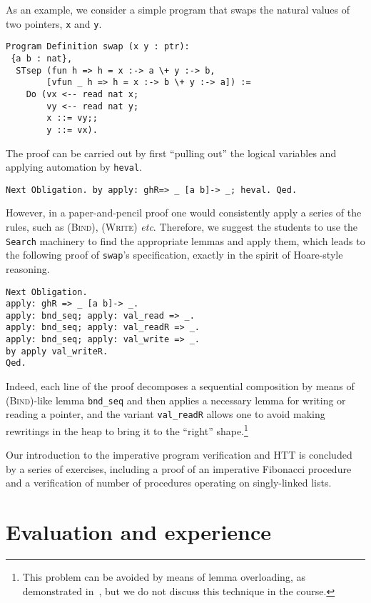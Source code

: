 \documentclass[blockstyle,preprint,nocopyrightspace]{sigplanconf}
\newcommand{\an}[1]{\textcolor{red}{(Aleks: {#1})}}
\newcommand{\code}[1]{\lstinline{#1}}
\newcommand{\etc}{\emph{etc}}
\begin{document}
As an example, we consider a simple program that swaps the natural
values of two pointers, \code{x} and \code{y}.
%
\begin{lstlisting}
Program Definition swap (x y : ptr):
 {a b : nat},
  STsep (fun h => h = x :-> a \+ y :-> b,
        [vfun _ h => h = x :-> b \+ y :-> a]) :=
    Do (vx <-- read nat x;
        vy <-- read nat y;
        x ::= vy;;
        y ::= vx).
\end{lstlisting}
%
The proof can be carried out by first ``pulling out'' the logical
variables and applying automation by \code{heval}.
%
\begin{lstlisting}
Next Obligation. by apply: ghR=> _ [a b]-> _; heval. Qed.
\end{lstlisting}
%
However, in a paper-and-pencil proof one would consistently apply a
series of the rules, such as \textsc{(Bind)}, \textsc{(Write)}
\etc. Therefore, we suggest the students to use the \code{Search}
machinery to find the appropriate lemmas and apply them, which leads
to the following proof of \code{swap}'s specification, exactly in the
spirit of Hoare-style reasoning.
%
\begin{lstlisting}
Next Obligation.
apply: ghR => _ [a b]-> _.
apply: bnd_seq; apply: val_read => _.
apply: bnd_seq; apply: val_readR => _.
apply: bnd_seq; apply: val_write => _.
by apply val_writeR.
Qed.
\end{lstlisting}
%
Indeed, each line of the proof decomposes a sequential composition by
means of \textsc{(Bind)}-like lemma \code{bnd_seq} and then applies a
necessary lemma for writing or reading a pointer, and the variant
\code{val_readR} allows one to avoid making rewritings in the heap to
bring it to the ``right'' shape.\footnote{This problem can be avoided
  by means of lemma overloading, as demonstrated
  in~\cite{Gonthier-al:JFP13}, but we do not discuss this technique
  in the course.}  
%

Our introduction to the imperative program verification and HTT is
concluded by a series of exercises, including a proof of an imperative
Fibonacci procedure and a verification of number of procedures
operating on singly-linked lists.


\section{Evaluation and experience}
\label{sec:eval-exper}
\end{document}
